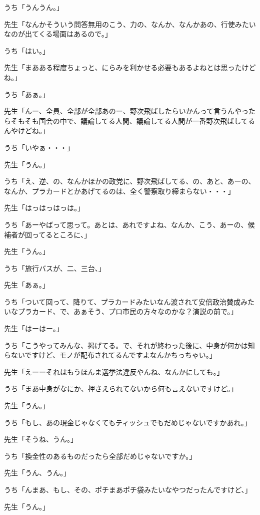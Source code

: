 \documentclass[b5j,twoside,twocolumn]{utarticle}
\begin{document}
\begin{description}
\item うち「うんうん。」
\item 先生「なんかそういう問答無用のこう、力の、なんか、なんかあの、行使みたいなのが出てくる場面はあるので。」
\item うち「はい。」
\item 先生「まあある程度ちょっと、にらみを利かせる必要もあるよねとは思ったけどね。」
\item うち「あぁ。」
\item 先生「んー、全員、全部が全部あのー、野次飛ばしたらいかんって言うんやったらそもそも国会の中で、議論してる人間、議論してる人間が一番野次飛ばしてるんやけどね。」
\item うち「いやぁ・・・」
\item 先生「うん。」
\item うち「え、逆、の、なんかほかの政党に、野次飛ばしてる、の、あと、あーの、なんか、プラカードとかあげてるのは、全く警察取り締まらない・・・」
\item 先生「はっはっはっは。」
\item うち「あーやばって思って。あとは、あれですよね、なんか、こう、あーの、候補者が回ってるところに、」
\item 先生「うん。」
\item うち「旅行バスが、二、三台、」
\item 先生「あぁ。」
\item うち「ついて回って、降りて、プラカードみたいなん渡されて安倍政治賛成みたいなプラカード、で、あぁそう、プロ市民の方々なのかな？演説の前で。」
\item 先生「はーはー。」
\item うち「こうやってみんな、掲げてる。で、それが終わった後に、中身が何かは知らないですけど、モノが配布されてるんですよなんかちっちゃい。」
\item 先生「えーーそれはもうほんま選挙法違反やんね、なんかにしても。」
\item うち「まあ中身がなにか、押さえられてないから何も言えないですけど。」
\item 先生「うん。」
\item うち「もし、あの現金じゃなくてもティッシュでもだめじゃないですかあれ。」
\item 先生「そうね、うん。」
\item うち「換金性のあるものだったら全部だめじゃないですか。」
\item 先生「うん、うん。」
\item うち「んまあ、もし、その、ポチまあポチ袋みたいなやつだったんですけど、」
\item 先生「うん。」

\end{description}
\end{document}
